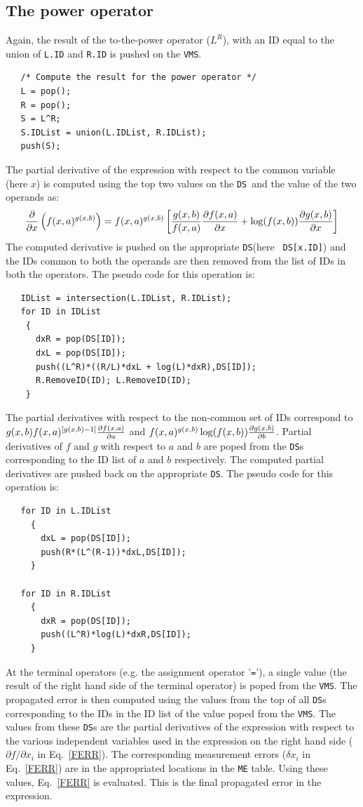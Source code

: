 \documentclass[acmtoms,acmnow]{acmtrans2m}
\newcommand{\DS}{{\tt DS}}
\newcommand{\VMS}{{\tt VMS}}
\begin{document}
%
%
\subsection{The power operator}

Again, the result of the to-the-power operator ($L^R$), with an ID
equal to the union of {\tt L.ID} and {\tt R.ID} is pushed on the \VMS.
\begin{verbatim}
   /* Compute the result for the power operator */
   L = pop();  
   R = pop();
   S = L^R;
   S.IDList = union(L.IDList, R.IDList);
   push(S);
\end{verbatim}
The partial derivative of the expression with respect to the common
variable (here $x$) is computed using the top two values on the \DS\
and the value of the two operands as:
\begin{equation}
{\partial \over {\partial
x}}\left(f(x,a)^{g(x,b)}\right)=f(x,a)^{g(x,b)} \left[{g(x,b) \over
f(x,a)} {\partial f(x,a)  \over \partial x} + \log(f(x,b)) 
{\partial g(x,b) \over \partial x} \right] 
\end{equation}
The computed derivative is pushed on the appropriate \DS (here {\tt
DS[x.ID]}) and the IDs common to both the operands are then removed
from the list of IDs in both the operators.  The pseudo code for this
operation is:
\begin{verbatim}
   IDList = intersection(L.IDList, R.IDList);
   for ID in IDList
    {
      dxR = pop(DS[ID]); 
      dxL = pop(DS[ID]);
      push((L^R)*((R/L)*dxL + log(L)*dxR),DS[ID]);
      R.RemoveID(ID); L.RemoveID(ID);
    }
\end{verbatim}
The partial derivatives with respect to the non-common set of IDs
correspond to $g(x,b)f(x,a)^{[g(x,b)-1]} {\partial f(x,a) \over
{\partial a}}$ and $f(x,a)^{g(x,b)} \log(f(x,b)) {\partial g(x,b)
\over \partial b}$.  Partial derivatives of $f$ and $g$ with respect
to $a$ and $b$ are poped from the \DS s corresponding to the ID list
of $a$ and $b$ respectively.  The computed partial derivatives are
pushed back on the appropriate \DS.  The pseudo code for this
operation is:
\begin{verbatim}
   for ID in L.IDList
     {
       dxL = pop(DS[ID]); 
       push(R*(L^(R-1))*dxL,DS[ID]);
     }

   for ID in R.IDList
     {
       dxR = pop(DS[ID]); 
       push((L^R)*log(L)*dxR,DS[ID]);
     }
\end{verbatim}
At the terminal operators (e.g. the assignment operator '{\tt =}'), a
single value (the result of the right hand side of the terminal
operator) is poped from the \VMS.  The propagated error is then
computed using the values from the top of all \DS s corresponding
to the IDs in the ID list of the value poped from the \VMS.  The
values from these \DS s are the partial derivatives of the
expression with respect to the various independent variables used in
the expression on the right hand side ($\partial f / \partial x_i$ in
Eq.~\ref{FERR}).  The corresponding measurement errors ($\delta x_i$
in Eq.~\ref{FERR}) are in the appropriated locations in the {\tt ME}
table.  Using these values, Eq.~\ref{FERR} is evaluated.  This is the
final propagated error in the expression.
\end{document}
